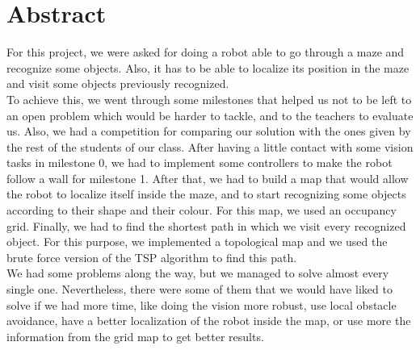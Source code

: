 \section{Abstract}

For this project, we were asked for doing a robot able to go through a maze and recognize some objects.
Also, it has to be able to localize its position in the maze and visit some objects previously recognized.\\

To achieve this, we went through some milestones that helped us not to be left to an open problem which would be harder to tackle, and to the teachers to evaluate us.
Also, we had a competition for comparing our solution with the ones given by the rest of the students of our class.
After having a little contact with some vision tasks in milestone 0, we had to implement some controllers to make the robot follow a wall for milestone 1.
After that, we had to build a map that would allow the robot to localize itself inside the maze, and to start recognizing some objects according to their shape and their colour.
For this map, we used an occupancy grid.
Finally, we had to find the shortest path in which we visit every recognized object.
For this purpose, we implemented a topological map and we used the brute force version of the TSP algorithm to find this path.\\

We had some problems along the way, but we managed to solve almost every single one.
Nevertheless, there were some of them that we would have liked to solve if we had more time, like doing the vision more robust, use local obstacle avoidance, have a better localization of the robot inside the map, or use more the information from the grid map to get better results.
